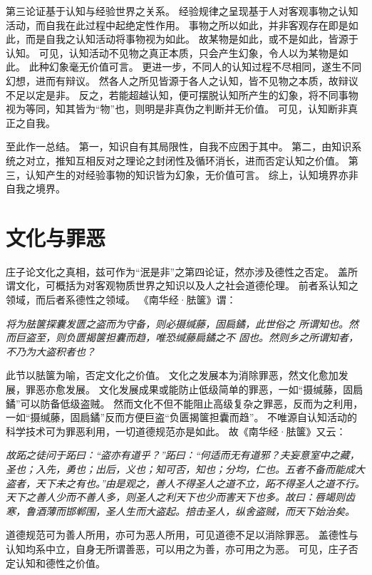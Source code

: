 \documentclass[11pt]{article}
\begin{document}
\newline

第三论证基于认知与经验世界之关系。
经验规律之呈现基于人对客观事物之认知活动，而自我在此过程中起绝定性作用。
事物之所以如此，并非客观存在即是如此，而是自我之认知活动将事物视为如此。
故某物是如此，或不是如此，皆源于认知。
可见，认知活动不见物之真正本质，只会产生幻象，令人以为某物是如此。
此种幻象毫无价值可言。
更进一步，不同人的认知过程不尽相同，遂生不同幻想，进而有辩议。
然各人之所见皆源于各人之认知，皆不见物之本质，故辩议不足以定是非。
反之，若能超越认知，便可摆脱认知所产生的幻象，将不同事物视为等同，知其皆为“物”也，则明是非真伪之判断并无价值。
可见，认知断非真正之自我。

\newline

至此作一总结。
第一，知识自有其局限性，自我不应困于其中。
第二，由知识系统之对立，推知互相反对之理论之封闭性及循环消长，进而否定认知之价值。
第三，认知产生的对经验事物的知识皆为幻象，无价值可言。
综上，认知境界亦非自我之境界。

\section{文化与罪恶}
庄子论文化之真相，兹可作为“泯是非”之第四论证，然亦涉及德性之否定。
盖所谓文化，可概括为对客观物质世界之知识以及人之社会道德伦理。
前者系认知之领域，而后者系德性之领域。
《南华经·胠箧》谓：

\textit{将为胠箧探囊发匮之盗而为守备，则必摄缄藤，固扃鐍，此世俗之 所谓知也。然而巨盗至，则负匮揭箧担囊而趋，唯恐缄藤扃鐍之不 固也。然则乡之所谓知者，不乃为大盗积者也？}

此节以胠箧为喻，否定文化之价值。
文化之发展本为消除罪恶，然文化愈加发展，罪恶亦愈发展。
文化发展成果或能防止低级简单的罪恶，一如“摄缄藤，固扃鐍”可以防备低级盗贼。
然而文化不但不能阻止高级复杂之罪恶，反而为之利用，一如“摄缄藤，固扃鐍”反而方便巨盗“负匮揭箧担囊而趋”。
不唯源自认知活动的科学技术可为罪恶利用，一切道德规范亦是如此。
故《南华经·胠箧》又云：

\textit{故跖之徒问于跖曰：“盗亦有道乎？”跖曰：“何适而无有道邪？夫妄意室中之藏，圣也；入先，勇也；出后，义也；知可否，知也；分均，仁也。五者不备而能成大盗者，天下未之有也。”由是观之，善人不得圣人之道不立，跖不得圣人之道不行。天下之善人少而不善人多，则圣人之利天下也少而害天下也多。故曰：唇竭则齿寒，鲁酒薄而邯郸围，圣人生而大盗起。掊击圣人，纵舍盗贼，而天下始治矣。}

道德规范可为善人所用，亦可为恶人所用，可见道德不足以消除罪恶。
盖德性与认知均系中立，自身无所谓善恶，可以用之为善，亦可用之为恶。
可见，庄子否定认知和德性之价值。
\end{document}
